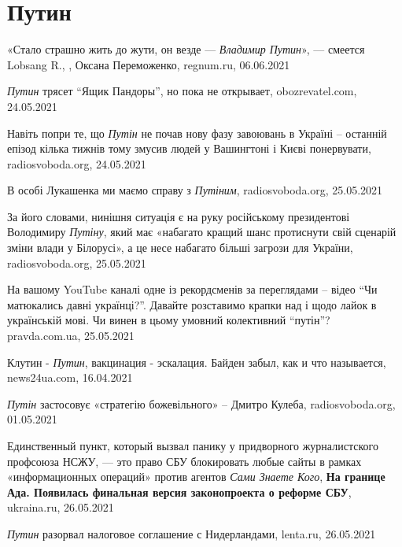  
 
 
 
 
\chapter{Путин}
\label{sec:slova.putin}

«Стало страшно жить до жути, он везде — \emph{Владимир Путин}», — смеется Lobsang R.,
, Оксана Переможенко, regnum.ru, 06.06.2021

\emph{Путин} трясет \enquote{Ящик Пандоры}, но пока не открывает,
obozrevatel.com, 24.05.2021

Навіть попри те, що \emph{Путін} не почав нову фазу завоювань в Україні –
останній епізод кілька тижнів тому змусив людей у Вашингтоні і Києві
понервувати, radiosvoboda.org, 24.05.2021

В особі Лукашенка ми маємо справу з \emph{Путіним}, radiosvoboda.org, 25.05.2021

За його словами, нинішня ситуація є на руку російському президентові Володимиру
\emph{Путіну}, який має «набагато кращий шанс протиснути свій сценарій зміни
влади у Білорусі», а це несе набагато більші загрози для України,
radiosvoboda.org, 25.05.2021

На вашому YouTube каналі одне із рекордсменів за переглядами – відео \enquote{Чи
матюкались давні українці?}. Давайте розставимо крапки над і щодо лайок в
українській мові. Чи винен в цьому умовний колективний \enquote{путін}?
pravda.com.ua, 25.05.2021

Клутин - \emph{Путин}, вакцинация - эскалация. Байден забыл, как и что
называется, news24ua.com, 16.04.2021

\emph{Путін} застосовує «стратегію божевільного» – Дмитро Кулеба, radiosvoboda.org, 01.05.2021

Единственный пункт, который вызвал панику у придворного журналистского
профсоюза НСЖУ, — это право СБУ блокировать любые сайты в рамках
«информационных операций» против агентов \emph{Сами Знаете Кого}, \textbf{На
границе Ада. Появилась финальная версия законопроекта о реформе СБУ},
ukraina.ru, 26.05.2021

\emph{Путин} разорвал налоговое соглашение с Нидерландами, lenta.ru, 26.05.2021

